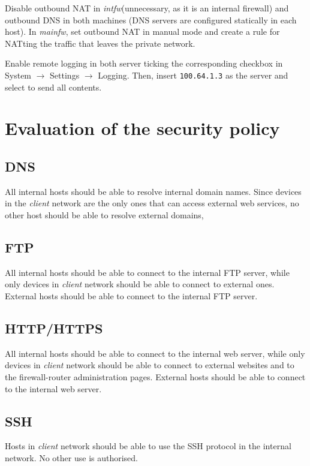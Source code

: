 \documentclass{homework}
\newcommand{\intfw}{\textit{intfw}\xspace}
\newcommand{\mainfw}{\textit{mainfw}\xspace}
\begin{document}
    Disable outbound NAT in \intfw (unnecessary, as it is an internal firewall) and outbound DNS in both machines (DNS servers are configured statically in each host). In \mainfw, set outbound NAT in manual mode and create a rule for NATting the traffic that leaves the private network.
    
    Enable remote logging in both server ticking the corresponding checkbox in System $\rightarrow$ Settings $\rightarrow$ Logging.
    Then, insert \texttt{100.64.1.3} as the server and select to send all contents.
    
    
    \section{Evaluation of the security policy}
    \subsection{DNS}
    All internal hosts should be able to resolve internal domain names.
    Since devices in the \textit{client} network are the only ones that can access external web services, no other host should be able to resolve external domains,
    
    \subsection{FTP}
    All internal hosts should be able to connect to the internal FTP server, while only devices in \textit{client} network should be able to connect to external ones.
    External hosts should be able to connect to the internal FTP server.
    
    \subsection{HTTP/HTTPS}
    All internal hosts should be able to connect to the internal web server, while only devices in \textit{client} network should be able to connect to external websites and to the firewall-router administration pages.
    External hosts should be able to connect to the internal web server.
    
    \subsection{SSH}
    Hosts in \textit{client} network should be able to use the SSH protocol in the internal network.
    No other use is authorised.
    
\end{document}
